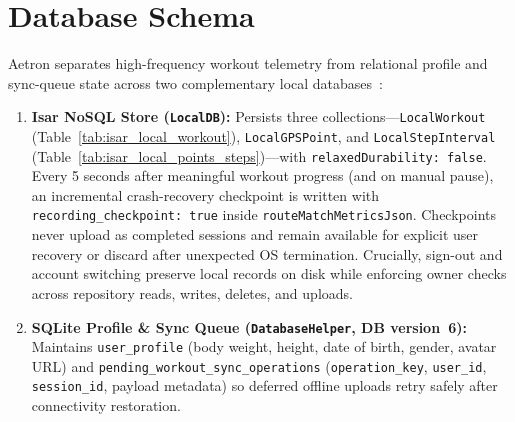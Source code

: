 \section{Database Schema}
Aetron separates high-frequency workout telemetry from relational profile and sync-queue state across two complementary local databases~\cite{isar2024database,sqflite2024}:
\begin{enumerate}
    \item \textbf{Isar NoSQL Store (\texttt{LocalDB}):} Persists three collections---\texttt{LocalWorkout} (Table~\ref{tab:isar_local_workout}), \texttt{LocalGPSPoint}, and \texttt{LocalStepInterval} (Table~\ref{tab:isar_local_points_steps})---with \texttt{relaxedDurability: false}. Every 5 seconds after meaningful workout progress (and on manual pause), an incremental crash-recovery checkpoint is written with \texttt{recording\_checkpoint: true} inside \texttt{routeMatchMetricsJson}. Checkpoints never upload as completed sessions and remain available for explicit user recovery or discard after unexpected OS termination. Crucially, sign-out and account switching preserve local records on disk while enforcing owner checks across repository reads, writes, deletes, and uploads.
    \item \textbf{SQLite Profile \& Sync Queue (\texttt{DatabaseHelper}, DB version~6):} Maintains \texttt{user\_profile} (body weight, height, date of birth, gender, avatar URL) and \texttt{pending\_workout\_sync\_operations} (\texttt{operation\_key}, \texttt{user\_id}, \texttt{session\_id}, payload metadata) so deferred offline uploads retry safely after connectivity restoration.
\end{enumerate}


